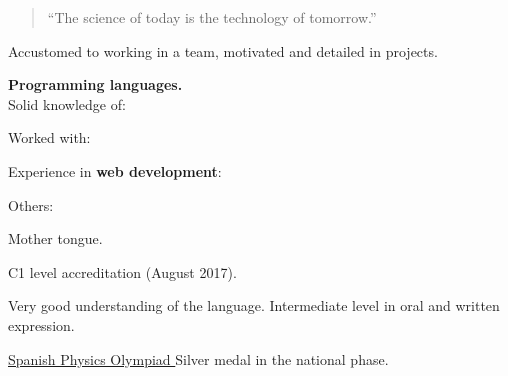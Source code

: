 

\begin{quote}
  ``The science of today is the technology of tomorrow.''
\end{quote}


Accustomed to working in a team, motivated and detailed in projects.%
\divider{}

\textbf{Programming languages.}\\[.5ex]
Solid knowledge of:\\[-2ex]
\begin{center}
\end{center}

Worked with: \quad
{}
\vspace{.75ex}
\divider{}


Experience in \textbf{web development}:
\vspace{-.05cm}
\begin{center}
\end{center}
\divider[empty]{}

Others:
\cvtag{\LaTeX}

\vspace{-8pt}%


\medskip
{}

\smallskip
Mother tongue.
\divider{}

\smallskip
C1 level accreditation (August 2017).
\divider{}

\smallskip
Very good understanding of the language. Intermediate level in oral and written
expression.


\medskip
{}


\cvachievement{\faTrophy}
{\href{https://rsef.es/olimpiada-espanola-de-fisica}
  {Spanish Physics Olympiad \smallskip}}
{\small{}%
  \small{}}
Silver medal in the national phase.


